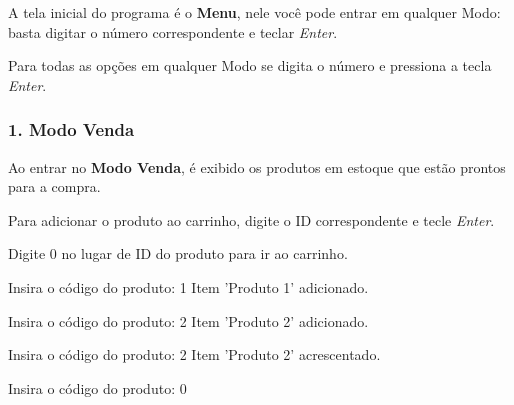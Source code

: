 \begin{DoxyItemize}
\item A tela inicial do programa é o {\bfseries Menu}, nele você pode entrar em qualquer Modo\+: basta digitar o número correspondente e teclar {\itshape Enter}.
\item Para todas as opções em qualquer Modo se digita o número e pressiona a tecla {\itshape Enter}. 


\end{DoxyItemize}

\subsubsection*{1. Modo Venda}




\begin{DoxyItemize}
\item Ao entrar no {\bfseries Modo Venda}, é exibido os produtos em estoque que estão prontos para a compra.
\item Para adicionar o produto ao carrinho, digite o ID correspondente e tecle {\itshape Enter}.
\item Digite 0 no lugar de ID do produto para ir ao carrinho. ~\newline

\end{DoxyItemize}

\begin{DoxyVerb}    Insira o código do produto: 1
    Item 'Produto 1' adicionado.

    Insira o código do produto: 2
    Item 'Produto 2' adicionado.

    Insira o código do produto: 2
    Item 'Produto 2' acrescentado.

    Insira o código do produto: 0
\end{DoxyVerb}



